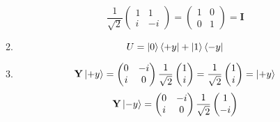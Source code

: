 \documentclass[12pt]{article}
\begin{document}
\begin{enumerate}[font=\bfseries]
\begin{enumerate}
\[                        \frac{1}{\sqrt{2}}\begin{pmatrix}
                        1 & 1 \\
                        i & -i
                        \end{pmatrix}
                        =
                        \begin{pmatrix}
                        1 & 0 \\
                        0 & 1
                        \end{pmatrix}
                        = \mathbf{I}
                        \]
                
            \item \[U = \ket{0}\bra{+y} + \ket{1}\bra{-y}\]
            \item \[
                    \mathbf{Y}\ket{+y} = \begin{pmatrix}
                                        0 & -i \\
                                        i & 0
                                        \end{pmatrix}
                                        \frac{1}{\sqrt{2}}
                                        \begin{pmatrix}
                                        1 \\ i
                                        \end{pmatrix}
                                        =
                                        \frac{1}{\sqrt{2}}
                                        \begin{pmatrix}
                                        1 \\ i
                                        \end{pmatrix}
                                        =
                                        \ket{+y}
                    \]
                    \[
                    \mathbf{Y}\ket{-y} = \begin{pmatrix}
                                        0 & -i \\
                                        i & 0
                                        \end{pmatrix}
                                        \frac{1}{\sqrt{2}}
                                        \begin{pmatrix}
                                        1 \\ -i
                                        \end{pmatrix}
\]
\end{enumerate}
\end{enumerate}
\end{document}
